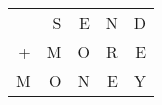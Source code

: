 \begin{tabular}{rrrrr}
  & S & E & N & D \\
+ & M & O & R & E \\ \hline
M & O & N & E & Y
\end{tabular}
